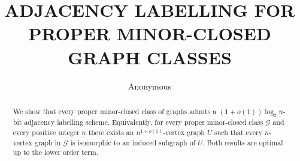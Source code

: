\documentclass{patmorin}
\title{\MakeUppercase{\boldmath  Adjacency labelling for proper minor-closed graph classes}}
\author{Anonymous}
\date{}
\newcommand{\david}[1]{{\color{orange} DW: #1}}
\newcommand{\vida}[1]{{\color{pink} VD: #1}}
\newcommand{\pat}[1]{\textcolor{Magenta}{PaMo: #1}}
\newcommand{\gwen}[1]{\textcolor{Purple}{GJ: #1}}
\newcommand{\piotr}[1]{\textcolor{red}{PiMi: #1}}
\begin{document}
\maketitle


\begin{abstract}
We show that every proper minor-closed class of graphs admits
a $(1+o(1))\log_2 n$-bit adjacency labelling scheme. Equivalently, for every proper minor-closed class $\mathcal{G}$ and every positive integer $n$ there exists an $n^{1+o(1)}$-vertex graph $U$ such that every $n$-vertex graph in $\mathcal{G}$ is isomorphic to an induced subgraph of $U$.
Both results are optimal up to the lower order term.
  \end{abstract}

\end{document}
